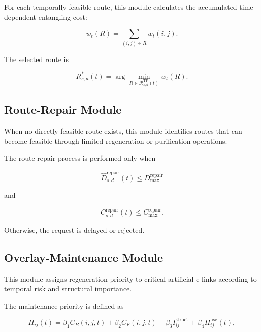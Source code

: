 For each temporally feasible route, this module calculates the accumulated time-dependent entangling cost:

\begin{equation}
    w_t(R)
    =
    \sum_{(i,j)\in R}
    w_t(i,j).
\end{equation}

The selected route is

\begin{equation}
    R_{s,d}^{*}(t)
    =
    \arg\min_{
    R
    \in
    \mathcal{R}_{s,d}^{\mathrm{TF}}(t)
    }
    w_t(R).
\end{equation}

\subsection{Route-Repair Module}

When no directly feasible route exists, this module identifies routes that can become feasible through limited regeneration or purification operations.

The route-repair process is performed only when

\begin{equation}
    \widehat{D}_{s,d}^{\mathrm{repair}}(t)
    \leq
    D_{\max}^{\mathrm{repair}}
\end{equation}

and

\begin{equation}
    C_{s,d}^{\mathrm{repair}}(t)
    \leq
    C_{\max}^{\mathrm{repair}}.
\end{equation}

Otherwise, the request is delayed or rejected.

\subsection{Overlay-Maintenance Module}

This module assigns regeneration priority to critical artificial e-links according to temporal risk and structural importance.

The maintenance priority is defined as

\begin{equation}
    \Pi_{ij}(t)
    =
    \beta_1
    C_B(i,j,t)
    +
    \beta_2
    C_F(i,j,t)
    +
    \beta_3
    I_{ij}^{\mathrm{struct}}
    +
    \beta_4
    H_{ij}^{\mathrm{use}}(t),
\end{equation}


